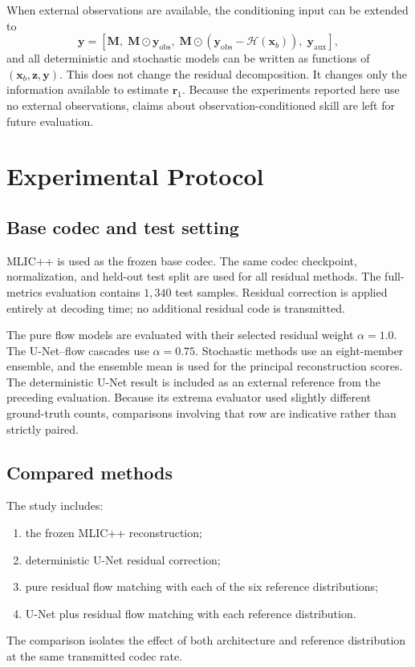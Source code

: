 \documentclass[11pt]{article}
\newcommand{\xb}{\mathbf{x}_{b}}
\newcommand{\z}{\mathbf{z}}
\newcommand{\rone}{\mathbf{r}_{1}}
\newcommand{\y}{\mathbf{y}}
\newcommand{\M}{\mathbf{M}}
\newcommand{\Hobs}{\mathcal{H}}
\begin{document}
When external observations are available, the conditioning input can be extended to
\begin{equation}
    \y =
    \left[
    \M,\;
    \M\odot \y_{\mathrm{obs}},\;
    \M\odot(\y_{\mathrm{obs}}-\Hobs(\xb)),\;
    \y_{\mathrm{aux}}
    \right],
\end{equation}
and all deterministic and stochastic models can be written as functions of $(\xb,\z,\y)$. This does not change the residual decomposition. It changes only the information available to estimate $\rone$. Because the experiments reported here use no external observations, claims about observation-conditioned skill are left for future evaluation.

\section{Experimental Protocol}

\subsection{Base codec and test setting}

MLIC++ is used as the frozen base codec. The same codec checkpoint, normalization, and held-out test split are used for all residual methods. The full-metrics evaluation contains $1{,}340$ test samples. Residual correction is applied entirely at decoding time; no additional residual code is transmitted.

The pure flow models are evaluated with their selected residual weight $\alpha=1.0$. The U-Net--flow cascades use $\alpha=0.75$. Stochastic methods use an eight-member ensemble, and the ensemble mean is used for the principal reconstruction scores. The deterministic U-Net result is included as an external reference from the preceding evaluation. Because its extrema evaluator used slightly different ground-truth counts, comparisons involving that row are indicative rather than strictly paired.

\subsection{Compared methods}

The study includes:
\begin{enumerate}[leftmargin=1.5em]
    \item the frozen MLIC++ reconstruction;
    \item deterministic U-Net residual correction;
    \item pure residual flow matching with each of the six reference distributions;
    \item U-Net plus residual flow matching with each reference distribution.
\end{enumerate}
The comparison isolates the effect of both architecture and reference distribution at the same transmitted codec rate.
\end{document}
